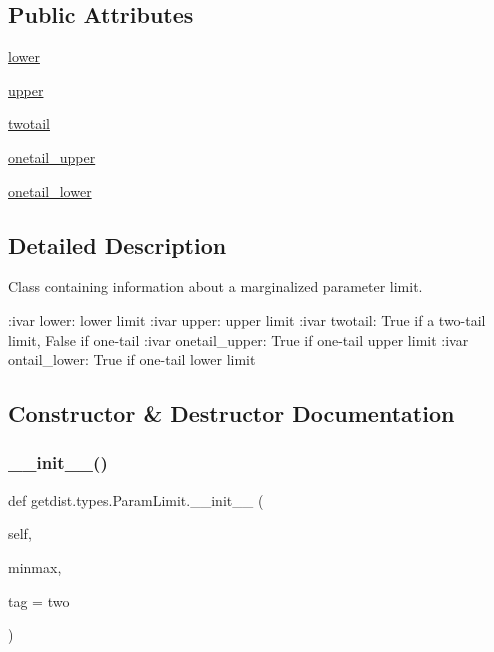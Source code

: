 \subsection*{Public Attributes}
\begin{DoxyCompactItemize}
\item 
\mbox{\hyperlink{classgetdist_1_1types_1_1ParamLimit_a81783a36c43cd8d9294249d03359846b}{lower}}
\item 
\mbox{\hyperlink{classgetdist_1_1types_1_1ParamLimit_a5b627d1abf77bd48d7405b361867f660}{upper}}
\item 
\mbox{\hyperlink{classgetdist_1_1types_1_1ParamLimit_ae19826f1e120be1bb4fd06c0d16da78b}{twotail}}
\item 
\mbox{\hyperlink{classgetdist_1_1types_1_1ParamLimit_a16b6d58598ec4d4b83f063277f5fce5f}{onetail\+\_\+upper}}
\item 
\mbox{\hyperlink{classgetdist_1_1types_1_1ParamLimit_a13bba3761cf2bc3760b0cada43f4234c}{onetail\+\_\+lower}}
\end{DoxyCompactItemize}


\subsection{Detailed Description}
\begin{DoxyVerb}Class containing information about a marginalized parameter limit.

:ivar lower: lower limit
:ivar upper: upper limit
:ivar twotail: True if a two-tail limit, False if one-tail
:ivar onetail_upper: True if one-tail upper limit
:ivar ontail_lower: True if one-tail lower limit
\end{DoxyVerb}
 

\subsection{Constructor \& Destructor Documentation}
\mbox{\label{classgetdist_1_1types_1_1ParamLimit_a9de61856c210782ef0863e8b7ada5f80}} 
\subsubsection{\texorpdfstring{\+\_\+\+\_\+init\+\_\+\+\_\+()}{\_\_init\_\_()}}
{\footnotesize\ttfamily def getdist.\+types.\+Param\+Limit.\+\_\+\+\_\+init\+\_\+\+\_\+ (\begin{DoxyParamCaption}\item[{}]{self,  }\item[{}]{minmax,  }\item[{}]{tag = {\ttfamily \textquotesingle{}two\textquotesingle{}} }\end{DoxyParamCaption})}

